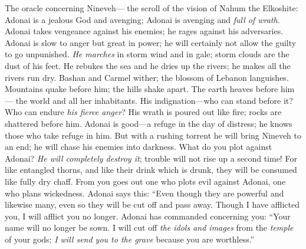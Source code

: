 
\begin{biblechapter} %
 The oracle concerning Nineveh— 
the scroll of the vision of Nahum the Elkoshite:
 Adonai is a jealous God and avenging; 
Adonai is avenging and \textit{full of wrath}. 
Adonai takes vengeance against his enemies; 
he rages against his adversaries.
\verse Adonai is slow to anger but great in power; 
he will certainly not allow the guilty to go unpunished. 
\textit{He marches} in storm wind and in gale; 
storm clouds are the dust of his feet.
\verse He rebukes the sea and he dries up the rivers; 
he makes all the rivers run dry. 
Bashan and Carmel wither; 
the blossom of Lebanon languishes.
\verse Mountains quake before him; 
the hills shake apart. 
The earth heaves before him— 
the world and all her inhabitants.
\verse His indignation—who can stand before it? 
Who can endure \textit{his fierce anger}? 
His wrath is poured out like fire; 
rocks are shattered before him.
\verse Adonai is good—a refuge in the day of distress; 
he knows those who take refuge in him.
\verse But with a rushing torrent he will bring Nineveh to an end; 
he will chase his enemies into darkness.
 What do you plot against Adonai? 
\textit{He will completely destroy it}; 
trouble will not rise up a second time!
\verse For like entangled thorns, 
and like their drink which is drunk, 
they will be consumed like fully dry chaff.
\verse From you goes out one who plots evil against Adonai, 
one who plans wickedness.
 Adonai says this:
\verse “Even though they are powerful and likewise many, 
even so they will be cut off and pass away. 
Though I have afflicted you, 
I will afflict you no longer.
\verse Adonai has commanded concerning you:
\verse “Your name will no longer be sown. 
I will cut off \textit{the idols and images} from the \textit{temple} of your gods; 
\textit{I will send you to the grave} because you are worthless.”
\end{biblechapter}

